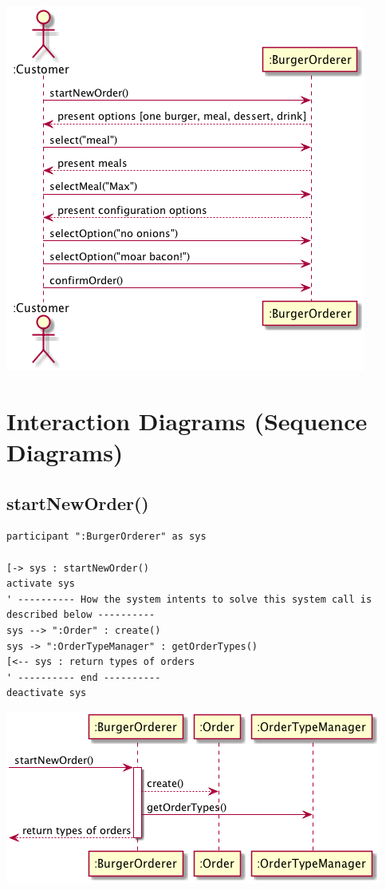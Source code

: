\documentclass[11pt]{article}
\begin{document}
\begin{center}
\includegraphics[width=.9\linewidth]{202004-bo-ssd.png}
\end{center}

\section{Interaction Diagrams (Sequence Diagrams)}
\label{sec:org20df242}
\subsection{startNewOrder()}
\label{sec:orgfd2464f}
\begin{verbatim}
participant ":BurgerOrderer" as sys

[-> sys : startNewOrder()
activate sys
' ---------- How the system intents to solve this system call is described below ----------
sys --> ":Order" : create()
sys -> ":OrderTypeManager" : getOrderTypes()
[<-- sys : return types of orders
' ---------- end ----------
deactivate sys
\end{verbatim}

\begin{center}
\includegraphics[width=.9\linewidth]{202004-bo-startNew.png}
\end{center}
\end{document}
